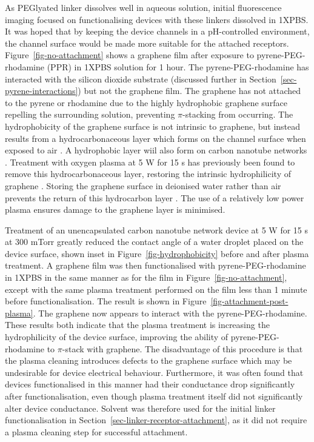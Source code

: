 \documentclass[
  a4paper,
]{scrbook}
\begin{document}
As PEGlyated linker dissolves well in aqueous solution, initial
fluorescence imaging focused on functionalising devices with these
linkers dissolved in 1XPBS. It was hoped that by keeping the device
channels in a pH-controlled environment, the channel surface would be
made more suitable for the attached receptors.
Figure~\ref{fig-no-attachment} shows a graphene film after exposure to
pyrene-PEG-rhodamine (PPR) in 1XPBS solution for 1 hour. The
pyrene-PEG-rhodamine has interacted with the silicon dioxide substrate
(discussed further in Section~\ref{sec-pyrene-interactions}) but not the
graphene film. The graphene has not attached to the pyrene or rhodamine
due to the highly hydrophobic graphene surface repelling the surrounding
solution, preventing \(\pi\)-stacking from occurring. The hydrophobicity
of the graphene surface is not intrinsic to graphene, but instead
results from a hydrocarbonaceous layer which forms on the channel
surface when exposed to air \autocite{Ashraf2014}. A hydrophobic layer
wiil also form on carbon nanotube networks
\autocite{Stando2019,Park2022}. Treatment with oxygen plasma at 5 W for
15 s has previously been found to remove this hydrocarbonaceous layer,
restoring the intrinsic hydrophilicity of graphene \autocite{Shin2010}.
Storing the graphene surface in deionised water rather than air prevents
the return of this hydrocarbon layer \autocite{Ashraf2014}. The use of a
relatively low power plasma ensures damage to the graphene layer is
minimised.

Treatment of an unencapsulated carbon nanotube network device at 5 W for
15 s at 300 mTorr greatly reduced the contact angle of a water droplet
placed on the device surface, shown inset in
Figure~\ref{fig-hydrophobicity} before and after plasma treatment. A
graphene film was then functionalised with pyrene-PEG-rhodamine in 1XPBS
in the same manner as for the film in Figure~\ref{fig-no-attachment},
except with the same plasma treatment performed on the film less than 1
minute before functionalisation. The result is shown in
Figure~\ref{fig-attachment-post-plasma}. The graphene now appears to
interact with the pyrene-PEG-rhodamine. These results both indicate that
the plasma treatment is increasing the hydrophilicity of the device
surface, improving the ability of pyrene-PEG-rhodamine to \(\pi\)-stack
with graphene. The disadvantage of this procedure is that the plasma
cleaning introduces defects to the graphene surface which may be
undesirable for device electrical behaviour. Furthermore, it was often
found that devices functionalised in this manner had their conductance
drop significantly after functionalisation, even though plasma treatment
itself did not significantly alter device conductance. Solvent was
therefore used for the initial linker functionalisation in
Section~\ref{sec-linker-receptor-attachment}, as it did not require a
plasma cleaning step for successful attachment.
\end{document}
